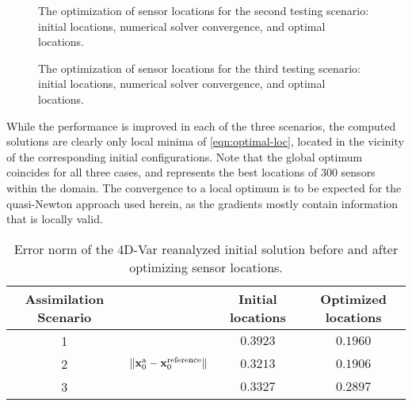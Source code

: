 \documentclass{article}
\newcommand{\x}{   \mathbf{x} }
\newcommand{\xa}{ \mathbf{x}^{\rm a} }
\begin{document}
\begin{figure}
\setcounter{subfigure}{0}
\centering
\caption{The optimization of sensor locations for the second testing scenario: initial locations, numerical solver convergence, and optimal locations.}
\end{figure}
 
\begin{figure}
\setcounter{subfigure}{0}
\centering
 \caption{The optimization of sensor locations for the third testing scenario: initial locations, numerical solver convergence, and optimal locations.}
 \label{fig:optobs_OBSLOC}
\end{figure}


While the performance is improved in each of the three scenarios, the computed solutions 
are clearly only local minima of \eqref{eqn:optimal-loc}, located in the vicinity of the corresponding
initial configurations. Note that the global optimum coincides for all three cases, and represents the best
locations of $300$ sensors within the domain.
The convergence to a local optimum is to be expected for the quasi-Newton
approach used herein, as the gradients mostly contain information that is locally valid.






\begin{table}
\caption{Error norm of the 4D-Var reanalyzed initial solution before and after optimizing sensor locations.}
\centering
{
\footnotesize
\begin{tabular}{|c|c||c|c|}
  \hline
  Assimilation Scenario & &  Initial locations & Optimized locations \\
 \hline\hline
1 &  & $0.3923$ & $0.1960$\\
 \cline{1-1} \cline{3-4}
2 & $\Vert \xa_0 - \x_0^{\rm reference} \Vert$ & $0.3213$ & $0.1906$\\
 \cline{1-1} \cline{3-4}
3 &  &  $0.3327$ & $0.2897$\\
 \hline
\end{tabular}
}
\label{Table:obsopt_gain3}
\end{table}
\end{document}
